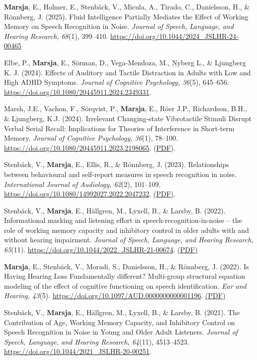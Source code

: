 \documentclass[]{article}
\begin{document}
\textbf{Marsja}, E., Holmer, E., Stenbäck, V., Micula, A., Tirado, C.,
Danielsson, H., \& Rönnberg, J. (2025). Fluid Intelligence Partially
Mediates the Effect of Working Memory on Speech Recognition in Noise.
\emph{Journal of Speech, Language, and Hearing Research, 68}(1),
399--410. \url{https://doi.org/10.1044/2024_JSLHR-24-00465}

Elbe, P., \textbf{Marsja}, E., Sörman, D., Vega-Mendoza, M., Nyberg L.,
\& Ljungberg K. J. (2024). Effects of Auditory and Tactile Distraction
in Adults with Low and High ADHD Symptoms. \emph{Journal of Cognitive
Psychology, 36}(5), 645--656.
\url{https://doi.org/10.1080/20445911.2024.2349331}.

Marsh, J.E., Vachon, F., Sörqvist, P., \textbf{Marsja}, E., Röer J.P.,
Richardson, B.H., \& Ljungberg, K.J. (2024). Irrelevant Changing-state
Vibrotactile Stimuli Disrupt Verbal Serial Recall: Implications for
Theories of Interference in Short-term Memory. \emph{Journal of
Cognitive Psychology, 36}(1), 78--100.
\url{https://doi.org/10.1080/20445911.2023.2198065}.
(\href{https://bit.ly/JoCP23}{PDF}).

Stenbäck, V., \textbf{Marsja}, E., Ellis, R., \& Rönnberg, J. (2023).
Relationships between behavioural and self-report measures in speech
recognition in noise. \emph{International Journal of Audiology, 62}(2),
101--109. \url{https://doi.org/10.1080/14992027.2022.2047232}.
\href{https://bit.ly/IJA2022}{(PDF)}.

Stenbäck, V., \textbf{Marsja}, E., Hällgren, M., Lyxell, B., \& Larsby,
B. (2022). Informational masking and listening effort in
speech-recognition-in-noise -- the role of working memory capacity and
inhibitory control in older adults with and without hearing impairment.
\emph{Journal of Speech, Language, and Hearing Research, 65}(11).
\url{https://doi.org/10.1044/2022_JSLHR-21-00674}.
\href{https://bit.ly/JSLHR22b}{(PDF)}

\textbf{Marsja}, E., Stenbäck, V., Moradi, S., Danielsson, H., \&
Rönnberg, J. (2022). Is Having Hearing Loss Fundamentally different?
Multi-group structural equation modeling of the effect of cognitive
functioning on speech identification. \emph{Ear and Hearing, 43}(5).
\url{https://doi.org/10.1097/AUD.0000000000001196}.
\href{https://bit.ly/EANDH22}{(PDF)}

Stenbäck, V., \textbf{Marsja}, E., Hällgren, M., Lyxell, B., \& Larsby,
B. (2021). The Contribution of Age, Working Memory Capacity, and
Inhibitory Control on Speech Recognition in Noise in Young and Older
Adult Listeners. \emph{Journal of Speech, Language, and Hearing
Research, 64}(11), 4513--4523.
\url{https://doi.org/10.1044/2021_JSLHR-20-00251}.
\end{document}
